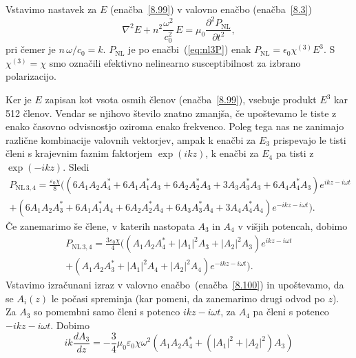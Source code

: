 Vstavimo nastavek za $E$ (enačba~\ref{8.99}) v valovno enačbo (enačba~\ref{8.3})
\begin{equation}
\nabla^{2}E+n^2\frac{\omega^{2}}{c_0^{2}}\, 
E=\mu_{0}\frac{\partial^2 P_{\mathrm{NL}}}{\partial t^2},
\label{8.100}
\end{equation}
pri čemer je $n\,\omega/c_0=k$. $P_{\textrm{NL}}$ je po enačbi~(\ref{eq:nl3P})
enak $P_\mathrm{NL}= \epsilon_{0}\chi^{(3)}E^3$. S $\chi^{(3)} = \chi$ smo označili
efektivno nelinearno susceptibilnost
za izbrano polarizacijo. 

Ker je $E$ zapisan kot vsota osmih členov
(enačba~\ref{8.99}), vsebuje produkt $E^3$ kar 512 členov. Vendar se njihovo število znatno zmanjša, 
če upoštevamo le tiste z enako časovno odvisnostjo oziroma enako frekvenco.
Poleg tega nas ne zanimajo različne kombinacije valovnih vektorjev, ampak k enačbi za $E_{3}$ 
prispevajo le tisti členi s krajevnim faznim faktorjem $\exp(ikz)$, 
k enačbi za $E_4$ pa tisti z $\exp(-ikz)$. Sledi
\begin{equation}
\begin{split}
P_{\mathrm{NL}\,3,4} = \frac{\varepsilon_0\chi}{8} \big(
\left(6 A_1 A_2 A_4^*+ 6A_1 A_1^*A_3 + 6A_2A_2^*A_3 + 3 A_3A_3^*A_3 + 6 A_4 A_4^* A_3\right)
e^{i k z - i\omega t} \\
+
\left(6 A_1 A_2 A_3^*+6 A_1 A_1^*A_4 + 6A_2A_2^*A_4 + 6 A_3A_3^*A_4 + 3 A_4 A_4^* A_4\right)
e^{-i k z - i\omega t} \big).
\end{split}
\end{equation}
Če zanemarimo še člene, v katerih nastopata $A_3$ in $A_4$ v višjih potencah, dobimo
\begin{equation}
\begin{split}
P_{\mathrm{NL}\,3,4} = \frac{3\varepsilon_0\chi}{4} \big(
\left( A_1 A_2 A_4^*+ |A_1|^2 A_3 + |A_2|^2 A_3 \right)
e^{i k z - i\omega t} \\
+ 
\left( A_1 A_2 A_3^*+|A_1|^2 A_4 + |A_2|^2A_4 \right)
e^{-i k z - i\omega t} \big).
\end{split}
\end{equation}
Vstavimo izračunani izraz v valovno enačbo~(enačba~\ref{8.100}) in upoštevamo, 
da se $A_i(z)$ le počasi 
spreminja (kar pomeni, da zanemarimo drugi odvod po $z$). Za $A_3$ so pomembni 
samo členi s potenco $ikz-i\omega t$, za $A_4$ pa členi s potenco $-ikz-i\omega t$. Dobimo 
\begin{equation}
i k \frac{dA_3}{dz} = - \frac{3}{4} \mu_0\varepsilon_0 \chi \omega^2 
\left( A_1 A_2 A_4^*+ (|A_1|^2 + |A_2|^2) A_3 \right)
\label{eq:opc1}
\end{equation}
